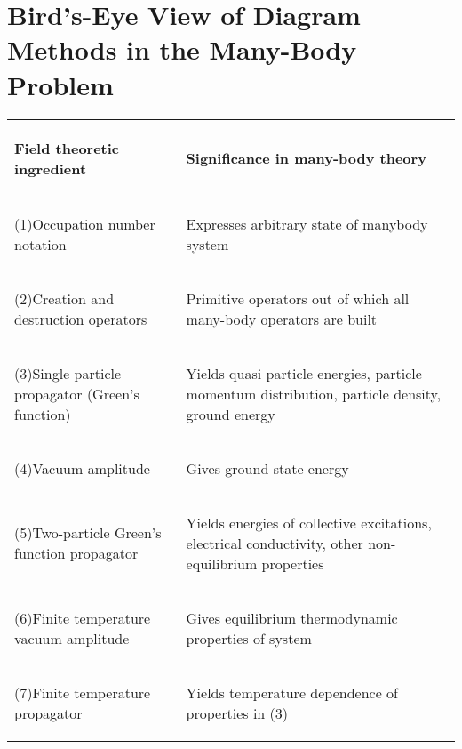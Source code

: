 \section{Bird's-Eye View of Diagram Methods in the
Many-Body Problem}
\begin{table}[H]
        \centering
        
\begin{tabular}{p{}p{}}
\hline 
 \begin{center}
Field theoretic ingredient
\end{center}
 & \begin{center}
Significance in many-body theory
\end{center}
 \\
\hline 
 \begin{center}
(1)Occupation number notation
\end{center}
 & \begin{center}
Expresses arbitrary state of manybody system
\end{center}
 \\
\begin{center}
(2)Creation and destruction operators
\end{center}
 & \begin{center}
Primitive operators out of which all many-body operators are built
\end{center}
 \\
\begin{center}
(3)Single particle propagator (Green's function)
\end{center}
 & \begin{center}
Yields quasi particle energies, particle momentum distribution, particle density, ground energy
\end{center}
 \\
\begin{center}
(4)Vacuum amplitude
\end{center}
 & \begin{center}
Gives ground state energy
\end{center}
 \\
\begin{center}
(5)Two-particle Green's function propagator 
\end{center}
 & \begin{center}
Yields energies of collective excitations, electrical conductivity, other non-equilibrium properties
\end{center}
 \\
\begin{center}
(6)Finite temperature vacuum amplitude
\end{center}
 & \begin{center}
Gives equilibrium thermodynamic properties of system
\end{center}
 \\
\begin{center}
(7)Finite temperature propagator
\end{center}
 & \begin{center}
Yields temperature dependence of properties in (3)
\end{center}
 \\


\end{tabular}
\end{table}

